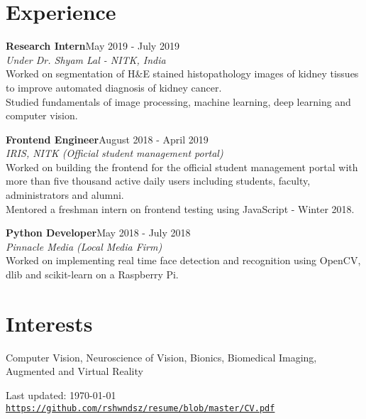 \documentclass[letterpaper]{article}
\def\footerlink{https://github.com/rshwndsz/resume/blob/master/CV.pdf}
\renewenvironment{itemize}{
  \begin{list}{}{
    \setlength{\leftmargin}{1.5em}
  }
}{
  \end{list}
}
\begin{document}
\section*{Experience}
  \begin{itemize}
    \item \textbf{Research Intern}\hfill{May 2019 - July 2019}\\
    \textit{Under Dr. Shyam Lal - NITK, India}\\
    Worked on segmentation of H\&E stained histopathology images of kidney tissues to improve automated diagnosis of kidney cancer.\\
    Studied fundamentals of image processing, machine learning, deep learning and computer vision.

    \item \textbf{Frontend Engineer}\hfill{August 2018 - April 2019}\\
    \textit{IRIS, NITK (Official student management portal)}\\
    Worked on building the frontend for the official student management portal with more than five thousand active daily users including students, faculty, administrators and alumni.\\
    Mentored a freshman intern on frontend testing using JavaScript - Winter 2018.

    \item \textbf{Python Developer}\hfill{May 2018 - July 2018}\\
    \textit{Pinnacle Media (Local Media Firm)}\\
    Worked on implementing real time face detection and recognition using OpenCV, dlib and scikit-learn on a Raspberry Pi.
  \end{itemize}

\section*{Interests}
  \begin{itemize}
    \item Computer Vision, Neuroscience of Vision, Bionics, Biomedical Imaging, Augmented and Virtual Reality
  \end{itemize}

\bigskip

\begin{center}
  \begin{footnotesize}
    Last updated: \today \\
    \href{\footerlink}{\texttt{\footerlink}}
  \end{footnotesize}
\end{center}
\end{document}

